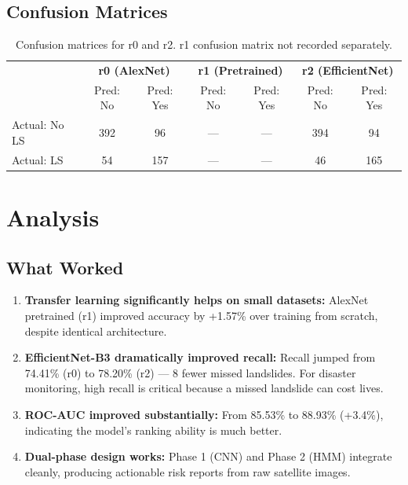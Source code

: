 \documentclass[11pt]{article}
\begin{document}
\subsection{Confusion Matrices}

\begin{table}[H]
    \centering
    \renewcommand{\arraystretch}{1.2}
    \begin{tabular}{l|cc|cc|cc}
        \toprule
         & \multicolumn{2}{c|}{\textbf{r0 (AlexNet)}} & \multicolumn{2}{c|}{\textbf{r1 (Pretrained)}} & \multicolumn{2}{c}{\textbf{r2 (EfficientNet)}} \\
         & Pred: No & Pred: Yes & Pred: No & Pred: Yes & Pred: No & Pred: Yes \\
        \midrule
        Actual: No LS & 392 & 96 & --- & --- & 394 & 94 \\
        Actual: LS    & 54  & 157 & --- & --- & 46  & 165 \\
        \bottomrule
    \end{tabular}
    \caption{Confusion matrices for r0 and r2. r1 confusion matrix not recorded separately.}
\end{table}

\section{Analysis}

\subsection{What Worked}

\begin{enumerate}
    \item \textbf{Transfer learning significantly helps on small datasets:} AlexNet pretrained (r1) improved accuracy by +1.57\% over training from scratch, despite identical architecture.
    \item \textbf{EfficientNet-B3 dramatically improved recall:} Recall jumped from 74.41\% (r0) to 78.20\% (r2) --- 8 fewer missed landslides. For disaster monitoring, high recall is critical because a missed landslide can cost lives.
    \item \textbf{ROC-AUC improved substantially:} From 85.53\% to 88.93\% (+3.4\%), indicating the model's ranking ability is much better.
    \item \textbf{Dual-phase design works:} Phase 1 (CNN) and Phase 2 (HMM) integrate cleanly, producing actionable risk reports from raw satellite images.
\end{enumerate}
\end{document}
